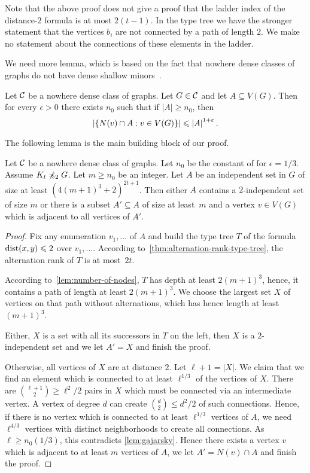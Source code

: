 Note that the above proof does not give a proof that the ladder
index of the distance-$2$ formula is at most $2(t-1)$. In the type
tree we have the stronger statement that the vertices $b_i$
are not connected by a path of length $2$. 
We make no statement about the connections
of these elements in the ladder. 

We need more lemma, which is based on the fact that
nowhere dense classes of graphs do not have dense 
shallow minors~\cite{dvorak2007asymptotical,jiang2011compact}. 

\begin{lemma}\label{lem:diversity}\label{lem:gajarsky}
Let $\mathcal{C}$ be a nowhere dense class of graphs. Let $G\in \mathcal{C}$ and let $A\subseteq V(G)$. 
Then for every $\epsilon>0$ there exists $n_0$ such that if $|A|\geq n_0$, then 
\[\left\lvert\{N(v)\cap A : v\in V(G)\}\right\rvert\leqslant\left\lvert A\right\rvert^{1+\varepsilon}.\]
\end{lemma}

The following lemma is the main building block of our proof. 

\begin{lemma}\label{lem:apex}
Let $\mathcal{C}$ be a nowhere dense class of graphs. 
Let $n_0$ be the constant of for $\epsilon=1/3$. 
Assume $K_t\not\preccurlyeq_2 G$. 
Let $m\geq n_0$ be an integer. 
Let $A$ be an independent set in $G$ of size at least $(4(m+1)^3+2)^{2t+1}$. 
Then either $A$ contains a $2$-independent set of size $m$ or
there is a subset $A'\subseteq A$ of size at least~$m$ and
a vertex $v\in V(G)$ which is adjacent to all vertices of $A'$. 
\end{lemma}
\begin{proof}
Fix any enumeration $v_1,\ldots$ of $A$ and
build the type tree $T$ of the formula $\mathrm{dist}(x,y)\leqslant 2$ over
$v_1,\ldots$. According to~\cref{thm:alternation-rank-type-tree}, 
the alternation rank of $T$ is at most~$2t$. 

According 
to~\cref{lem:number-of-nodes}, $T$ has depth at least $2(m+1)^3$, hence, 
it contains a path of length at least $2(m+1)^3$. We choose the largest set $X$
of vertices on that path without alternations, which has hence length
at least $(m+1)^3$. 

Either, $X$ is a set with all its successors in $T$ on the left, 
then $X$ is a $2$-independent set and we let $A'=X$ and finish the proof.

Otherwise, all vertices of $X$ are at distance $2$. Let $\ell+1=|X|$. 
We claim that we find an element which is connected to at least $\ell^{1/3}$
of the vertices of $X$. There are $\binom{\ell+1}{2}\geq \ell^2/2$ pairs in $X$ which 
must be connected via an intermediate vertex. A vertex of degree
$d$ can create $\binom{d}{2}\leq d^2/2$ of such connections. 
Hence, if there is no vertex which is connected to at least $\ell^{1/3}$
vertices of $A$, we need $\ell^{4/3}$ vertices with distinct neighborhoods
to create all connections. As $\ell\geq n_0(1/3)$, 
this contradicts \cref{lem:gajarsky}. Hence there exists a vertex $v$ which is 
adjacent to at least $m$ vertices of $A$, we let $A'=N(v)\cap A$ and finish 
the proof. 
\end{proof}


